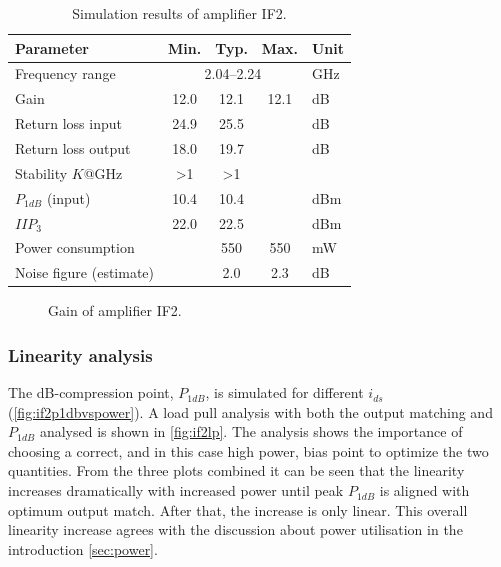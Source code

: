 				\begin{table}[hbt!]
					\caption[Simulation results of amplifier IF2.]{Simulation results of amplifier IF2.\disclaimer}
					\label{tab:resultif2}
					\centering
					\begin{tabular}{ l c c c l }\toprule
						Parameter & Min. & Typ. & Max. & Unit \\\midrule
						Frequency range & \multicolumn{3}{c}{2.04--2.24} & GHz \\
						Gain & 12.0 & 12.1 & 12.1 & dB \\
						Return loss input & 24.9 & 25.5 &  & dB \\
						Return loss output & 18.0 & 19.7 &  & dB \\
						Stability $K$@\unit[0--70]{GHz} & >1 & >1 &  &  \\
						$P_{1dB}$ (input) & 10.4 & 10.4 &  & dBm \\
						$IIP_3$ & 22.0 & 22.5 &  & dBm \\
						Power consumption &  & 550 & 550 & mW \\
						Noise figure (estimate) &  & 2.0 & 2.3 & dB \\\bottomrule
					\end{tabular}
				\end{table}
				
				\begin{figure}[hbt!]
					\centering
					\caption[Amplifier IF2 gain.]{Gain of amplifier IF2.}\label{fig:if2gain}
				\end{figure}

			\subsubsection{Linearity analysis}
				The \unit[1]{dB}-compression point, $P_{1dB}$, is simulated for different $i_{ds}$ (\autoref{fig:if2p1dbvspower}). A load pull analysis with both the output matching and $P_{1dB}$ analysed is shown in \autoref{fig:if2lp}. The analysis shows the importance of choosing a correct, and in this case high power, bias point to optimize the two quantities. From the three plots combined it can be seen that the linearity increases dramatically with increased power until peak $P_{1dB}$ is aligned with optimum output match. After that, the increase is only linear. This overall linearity increase agrees with the discussion about power utilisation in the introduction {\autoref{sec:power}}.

